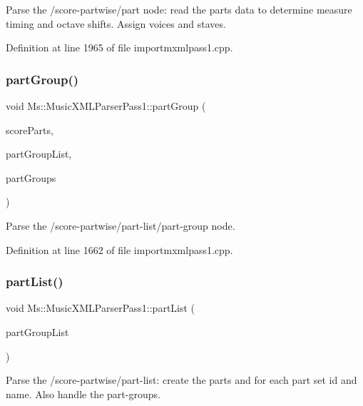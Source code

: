 Parse the /score-\/partwise/part node\+: read the parts data to determine measure timing and octave shifts. Assign voices and staves. 

Definition at line 1965 of file importmxmlpass1.\+cpp.

\mbox{\label{class_ms_1_1_music_x_m_l_parser_pass1_a5a2df24d7b9d1d37082d3cb3db296f89}} 
\subsubsection{\texorpdfstring{part\+Group()}{partGroup()}}
{\footnotesize\ttfamily void Ms\+::\+Music\+X\+M\+L\+Parser\+Pass1\+::part\+Group (\begin{DoxyParamCaption}\item[{const int}]{score\+Parts,  }\item[{Music\+Xml\+Part\+Group\+List \&}]{part\+Group\+List,  }\item[{Music\+Xml\+Part\+Group\+Map \&}]{part\+Groups }\end{DoxyParamCaption})}

Parse the /score-\/partwise/part-\/list/part-\/group node. 

Definition at line 1662 of file importmxmlpass1.\+cpp.

\mbox{\label{class_ms_1_1_music_x_m_l_parser_pass1_a1abbf626a79e74b39c84b530765f6a5f}} 
\subsubsection{\texorpdfstring{part\+List()}{partList()}}
{\footnotesize\ttfamily void Ms\+::\+Music\+X\+M\+L\+Parser\+Pass1\+::part\+List (\begin{DoxyParamCaption}\item[{Music\+Xml\+Part\+Group\+List \&}]{part\+Group\+List }\end{DoxyParamCaption})}

Parse the /score-\/partwise/part-\/list\+: create the parts and for each part set id and name. Also handle the part-\/groups. 

